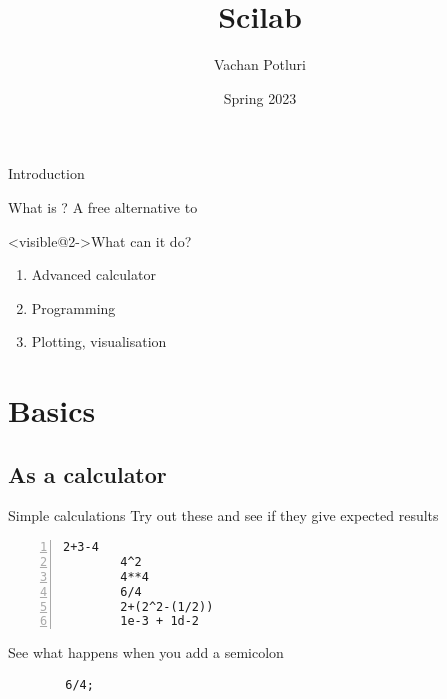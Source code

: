 





\setlength\leftmargini{1em} %
\setlength\leftmarginii{\leftmargini} %
\setlength\leftmarginiii{\leftmarginii} %

{
    \title{Scilab}
    \author[Vachan Potluri]{%
        Vachan Potluri\\
    }
    \date{Spring 2023}
    \begin{frame}
        \titlepage
    \end{frame}
}

\begin{frame}{Introduction}
    \begin{block}{What is \scilab?}
        A free alternative to \matlab
    \end{block}
    \begin{block}<visible@2->{What can it do?}
        \begin{enumerate}
            \item Advanced calculator
            \item Programming
            \item Plotting, visualisation
        \end{enumerate}
    \end{block}
\end{frame}

\section{Basics}
\subsection{As a calculator}
\begin{frame}[fragile]{Simple calculations}
    Try out these and see if they give expected results
    \begin{lstlisting}[numbers=left]
        2+3-4
        4^2
        4**4
        6/4
        2+(2^2-(1/2))
        1e-3 + 1d-2
    \end{lstlisting}
    See what happens when you add a semicolon
    \begin{lstlisting}
        6/4;
    \end{lstlisting}
\end{frame}

